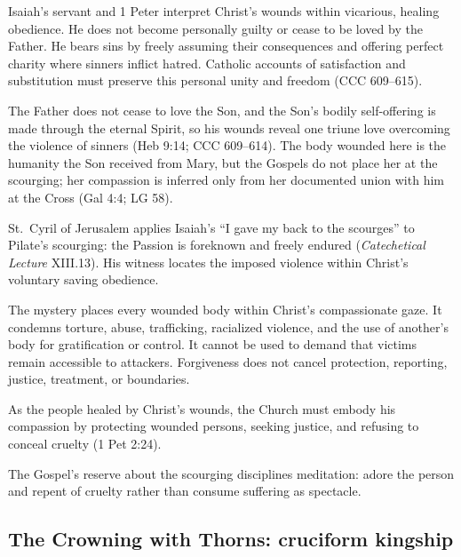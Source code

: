 Isaiah's servant and 1 Peter interpret Christ's wounds within vicarious, healing obedience. He does not become personally guilty or cease to be loved by the Father. He bears sins by freely assuming their consequences and offering perfect charity where sinners inflict hatred. Catholic accounts of satisfaction and substitution must preserve this personal unity and freedom (CCC 609--615).

The Father does not cease to love the Son, and the Son's bodily self-offering is made through the eternal Spirit, so his wounds reveal one triune love overcoming the violence of sinners (Heb 9:14; CCC 609--614). The body wounded here is the humanity the Son received from Mary, but the Gospels do not place her at the scourging; her compassion is inferred only from her documented union with him at the Cross (Gal 4:4; LG 58).

St.~Cyril of Jerusalem applies Isaiah's ``I gave my back to the scourges'' to Pilate's scourging: the Passion is foreknown and freely endured (\emph{Catechetical Lecture} XIII.13). His witness locates the imposed violence within Christ's voluntary saving obedience.

The mystery places every wounded body within Christ's compassionate gaze. It condemns torture, abuse, trafficking, racialized violence, and the use of another's body for gratification or control. It cannot be used to demand that victims remain accessible to attackers. Forgiveness does not cancel protection, reporting, justice, treatment, or boundaries.

As the people healed by Christ's wounds, the Church must embody his compassion by protecting wounded persons, seeking justice, and refusing to conceal cruelty (1 Pet 2:24).

The Gospel's reserve about the scourging disciplines meditation: adore the person and repent of cruelty rather than consume suffering as spectacle.

\subsection{The Crowning with Thorns: cruciform kingship}


